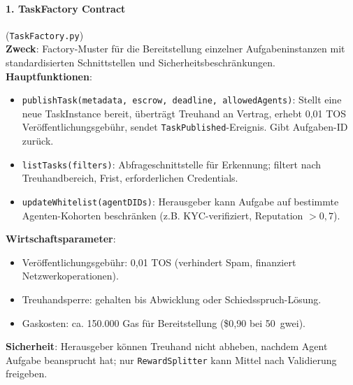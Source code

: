 \documentclass[11pt]{article}
\begin{document}
\paragraph{1. TaskFactory Contract} (\texttt{TaskFactory.py})\\
\textbf{Zweck}: Factory-Muster für die Bereitstellung einzelner Aufgabeninstanzen mit standardisierten Schnittstellen und Sicherheitsbeschränkungen.\\
\textbf{Hauptfunktionen}:
\begin{itemize}[noitemsep]
  \item \texttt{publishTask(metadata, escrow, deadline, allowedAgents)}: Stellt eine neue TaskInstance bereit, überträgt Treuhand an Vertrag, erhebt 0,01 TOS Veröffentlichungsgebühr, sendet \texttt{TaskPublished}-Ereignis. Gibt Aufgaben-ID zurück.
  \item \texttt{listTasks(filters)}: Abfrageschnittstelle für Erkennung; filtert nach Treuhandbereich, Frist, erforderlichen Credentials.
  \item \texttt{updateWhitelist(agentDIDs)}: Herausgeber kann Aufgabe auf bestimmte Agenten-Kohorten beschränken (z.B. KYC-verifiziert, Reputation $>0,7$).
\end{itemize}
\textbf{Wirtschaftsparameter}:
\begin{itemize}[noitemsep]
  \item Veröffentlichungsgebühr: 0,01 TOS (verhindert Spam, finanziert Netzwerkoperationen).
  \item Treuhandsperre: gehalten bis Abwicklung oder Schiedsspruch-Lösung.
  \item Gaskosten: ca. 150.000 Gas für Bereitstellung (\$0,90 bei 50~gwei).
\end{itemize}
\textbf{Sicherheit}: Herausgeber können Treuhand nicht abheben, nachdem Agent Aufgabe beansprucht hat; nur \texttt{RewardSplitter} kann Mittel nach Validierung freigeben.
\end{document}
